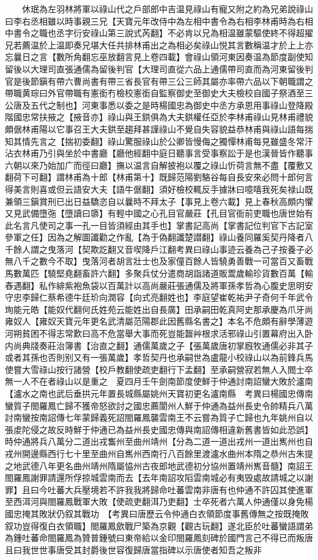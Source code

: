 　　休珉為左羽林將軍以祿山代之戶部郎中吉温見祿山有寵又附之約為兄弟說祿山曰李右丞相雖以時事親三兄【天寶元年改侍中為左相中書令為右相李林甫時為右相中書令之職也丞字衍安祿山第三說式芮翻】不必肯以兄為相温雖蒙驅使終不得超擢兄若薦温於上温即奏兄堪大任共排林甫出之為相必矣祿山悦其言數稱温才於上上亦忘曩日之言【數所角翻忘巫放翻言見上卷四載】會祿山領河東因奏温為節度副使知留後以大理司直張通儒為留後判官【大理司直從六品上通儒帶司直而為河東留後判官是後節鎭有帶六曹尚書有帶三省長官有帶三公三師其屬亦率帶六品以下朝職謂之帶職黄琮曰外官帶職有憲銜冇檢校憲銜自監察御史至御史大夫檢校自國子祭酒至三公唐及五代之制也】河東事悉以委之是時楊國忠為御史中丞方承恩用事祿山登降殿階國忠常扶掖之【掖音亦】祿山與王鉷俱為大夫鉷權任亞於李林甫祿山見林甫禮貌頗倨林甫陽以它事召王大夫鉷至趨拜甚謹祿山不覺自失容貌益恭林甫與祿山語每揣知其情先言之【揣初委翻】祿山驚服祿山於公卿皆慢侮之獨憚林甫每見雖盛冬常汗沾衣林甫乃引與坐於中書廳【廳他經翻中庭日聽事言受事察訟于是也漢晉皆作聽事六朝以來乃始加广而徑曰廳】撫以温言自解披袍以覆之祿山忻荷言無不盡【覆敷又翻荷下可翻】謂林甫為十郎【林甫第十】既歸范陽劉駱谷每自長安來必問十郎何言得美言則喜或但云語安大夫【語牛倨翻】須好檢校輒反手據牀曰噫嘻我死矣禄山既兼領三鎭賞刑已出日益驕恣自以曩時不拜太子【事見上卷六載】見上春秋高頗内懼又見武備墮㢮【墮讀曰隳】有輕中國之心孔目官嚴莊【孔目官衙前吏職也唐世始有此名言凡使司之事一孔一目皆須經由其手也】掌書記高尚【掌書記位判官下古記室參軍之任】因為之解圖讖勸之作亂【為于偽翻讖楚譛翻】祿山養同羅奚契丹降者八千餘人謂之曳落河【契欺訖翻又音喫降戶江翻考異曰祿山事迹云養為己子按養子必無八千之數今不取】曳落河者胡言壯士也及家僮百餘人皆驍勇善戰一可當百又畜戰馬數萬匹【驍堅堯翻畜許六翻】多聚兵仗分遣商胡詣諸道販鬻歲輸珍貨數百萬【輸舂遇翻】私作緋紫袍魚袋以百萬計以高尚嚴莊張通儒及將軍孫孝哲為心腹史思明安守忠李歸仁蔡希德牛廷玠向潤容【向式亮翻姓也】李庭望崔乾祐尹子奇何千年武令珣能元皓【能奴代翻何氏姓苑云能姓出自長廣】田承嗣田乾真阿史那承慶為爪牙尚雍奴人【雍奴天寶元年更名武清屬范陽郡此因舊縣名書之】本名不危頗有辭學薄遊河朔貧困不得志常歎曰高不危當舉大事而死豈能齧艸根求活邪祿山引置幕府出入卧内尚典牋奏莊治簿書【治直之翻】通儒萬歲之子【張萬歲唐初掌廐牧通儒必非其子或者其孫也否則别又有一張萬歲】孝哲契丹也承嗣世為盧龍小校祿山以為前鋒兵馬使嘗大雪祿山按行諸營【校戶教翻使疏吏翻行下孟翻】至承嗣營寂若無人入閲士卒無一人不在者祿山以是重之　夏四月壬午劍南節度使鮮于仲通討南詔蠻大敗於瀘南【瀘水之南也武后垂拱元年置長城縣屬姚州天寶初更名瀘南縣　考異曰楊國忠傳南蠻質子閤羅鳳亡歸不獲帝怒欲討之國忠薦閬州人鮮于仲通為益州長史令帥精兵八萬討南蠻按南詔傳七年蒙歸義死詔閤羅鳳襲雲南王不云嘗為質子亡歸也九年姚州自以張䖍陀侵之故反時鮮于仲通已為益州長史國忠傳與南詔傳相違新舊書皆如此恐誤】時仲通將兵八萬分二道出戎雟州至曲州靖州【分為二道一道出戎州一道出嶲州也自戎州開邊縣西行七十里至曲州自嶲州西南行八百餘里渡瀘水曲州本隋之恭州古朱提之地武德八年更名曲州靖州隋屬恊州古夜郎地武德初分協州置靖州嶲音髓】南詔王閤羅鳳謝罪請還所俘掠城雲南而去【去年南詔攻䧟雲南城必有夷毁處故請城之以謝罪】且曰今吐蕃大兵壓境若不許我我將歸命吐蕃雲南非唐有也仲通不許囚其使進軍至西洱河與閤羅鳳戰軍大敗【使疏吏翻洱乃吏翻】士卒死者六萬人仲通僅以身免楊國忠掩其敗狀仍叙其戰功　【考異曰唐歷云令仲通白衣領節度事舊傳無之按既掩敗叙功豈得復白衣領職】閤羅鳳歛戰尸築為京觀【觀古玩翻】遂北臣於吐蕃蠻語謂弟為鍾吐蕃命閤羅鳳為贊普鍾號曰東帝給以金印閤羅鳳刻碑於國門言己不得已而叛唐且曰我世世事唐受其封爵後世容復歸唐當指碑以示唐使者知吾之叛非